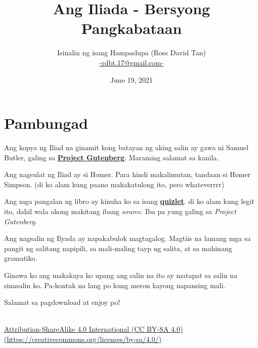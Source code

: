 \documentclass[12pt,letterpaper]{report}
\begin{document}
\title{\textbf{Ang Iliada - Bersyong Pangkabataan}}
\author{Isinalin ng isang Hampaslupa (Ross David Tan) \\ \href{mailto:rdbt.17@gmail.com}{-rdbt.17@gmail.com-}}
\date{June 19, 2021}
\maketitle

\tableofcontents
\pagebreak

\setlength{\parskip}{1em}

\chapter*{Pambungad}
\begin{center}

    Ang kopya ng Iliad na ginamit kong batayan ng aking salin ay gawa ni Samuel Butler, galing sa \href{https://www.gutenberg.org/}{\textbf{Project Gutenberg}}. Maraming salamat sa kanila.

    Ang nagsulat ng Iliad ay si Homer. Para hindi makalimutan, tandaan si Homer Simpson. (di ko alam kung paano makakatulong ito, pero whateverrrr)

    Ang mga pangalan ng libro ay kinuha ko sa isang \href{https://quizlet.com/24340225/titles-of-each-book-in-the-iliad-flash-cards/}{\textbf{quizlet}}.     di ko alam kung legit ito, dahil wala akong makitang ibang \textit{source}. Iba pa yung galing sa \textit{Project Gutenberg}.

    Ang nagsalin ng Ilyada ay napakabulok magtagalog. Magtiis na lamang mga sa pangit ng salitang napipili, sa mali-maling tayp ng salita, at sa mahinang gramatiko.

    Ginawa ko ang makakaya ko upang ang salin na ito ay matapat sa salin na sinasalin ko. Pa-kontak na lang po kung meron kayong napansing mali.

    Salamat sa pagdownload at enjoy po!
    \vspace*{\fill}
\end{center}
\pagebreak

\vspace*{\fill}
\begin{center}
    \href{https://creativecommons.org/licenses/by-sa/4.0/}{\ccbysa \\[0.5cm] Attribution-ShareAlike 4.0 International (CC BY-SA 4.0) \\ (https://creativecommons.org/licenses/by-sa/4.0/)}
    
\end{center}
\vspace*{\fill}
\end{document}
